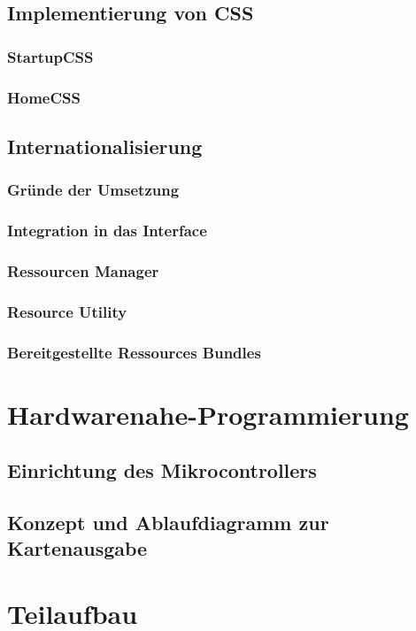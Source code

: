\subsection{Implementierung von CSS}
\subsubsection{StartupCSS}
\subsubsection{HomeCSS}
\subsection{Internationalisierung}
\subsubsection{Gründe der Umsetzung}
\subsubsection{Integration in das Interface}
\subsubsection{Ressourcen Manager}
\subsubsection{Resource Utility}
\subsubsection{Bereitgestellte Ressources Bundles}

\section{Hardwarenahe-Programmierung}
\subsection{Einrichtung des Mikrocontrollers}
\subsection{Konzept und Ablaufdiagramm zur Kartenausgabe} \label{ssec:konzeptCardDeal}
\section{Teilaufbau}
